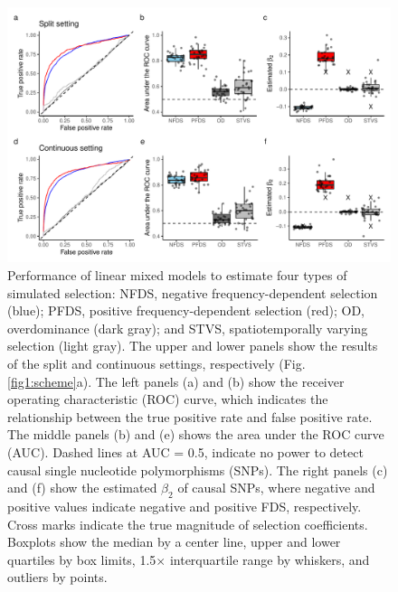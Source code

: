 \documentclass[12pt,]{article}
\begin{document}
\begin{figure}[ht]
  \includegraphics[width=0.7\linewidth]{beta2LMMdomi.pdf}
  \caption{Performance of linear mixed models to estimate four types of simulated selection: NFDS, negative frequency-dependent selection (blue); PFDS, positive frequency-dependent selection (red); OD, overdominance (dark gray); and STVS, spatiotemporally varying selection (light gray). The upper and lower panels show the results of the split and continuous settings, respectively (Fig. \ref{fig1:scheme}a). The left panels (a) and (b) show the receiver operating characteristic (ROC) curve, which indicates the relationship between the true positive rate and false positive rate. The middle panels (b) and (e) shows the area under the ROC curve (AUC). Dashed lines at AUC = 0.5, indicate no power to detect causal single nucleotide polymorphisms (SNPs). The right panels (c) and (f) show the estimated $\beta_2$ of causal SNPs, where negative and positive values indicate negative and positive FDS, respectively. Cross marks indicate the true magnitude of selection coefficients. Boxplots show the median by a center line, upper and lower quartiles by box limits, 1.5$\times$ interquartile range by whiskers, and outliers by points.}
  \label{fig4:beta2LMM}
\end{figure}
\end{document}

